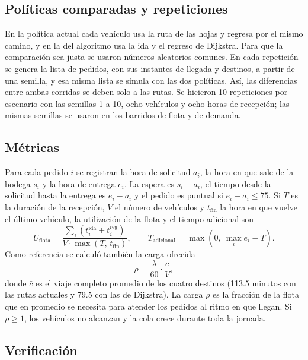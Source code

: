 \documentclass[11pt,letterpaper]{article}
\begin{document}
\subsection{Políticas comparadas y repeticiones}

En la política actual cada vehículo usa la ruta de las hojas y regresa por el mismo camino, y en la del algoritmo usa la ida y el regreso de Dijkstra. Para que la comparación sea justa se usaron números aleatorios comunes. En cada repetición se genera la lista de pedidos, con sus instantes de llegada y destinos, a partir de una semilla, y esa misma lista se simula con las dos políticas. Así, las diferencias entre ambas corridas se deben solo a las rutas. Se hicieron 10 repeticiones por escenario con las semillas 1 a 10, ocho vehículos y ocho horas de recepción; las mismas semillas se usaron en los barridos de flota y de demanda.

\subsection{Métricas}

Para cada pedido $i$ se registran la hora de solicitud $a_i$, la hora en que sale de la bodega $s_i$ y la hora de entrega $e_i$. La espera es $s_i-a_i$, el tiempo desde la solicitud hasta la entrega es $e_i-a_i$ y el pedido es puntual si $e_i-a_i\le 75$. Si $T$ es la duración de la recepción, $V$ el número de vehículos y $t_{\text{fin}}$ la hora en que vuelve el último vehículo, la utilización de la flota y el tiempo adicional son
\begin{equation}
  U_{\text{flota}} = \frac{\sum_i \left(t^{\text{ida}}_{i} + t^{\text{reg}}_{i}\right)}{V\cdot\max(T,\,t_{\text{fin}})},
  \qquad
  T_{\text{adicional}} = \max\left(0,\ \max_i e_i - T\right).
\end{equation}
Como referencia se calculó también la carga ofrecida
\begin{equation}
  \rho = \frac{\lambda}{60}\cdot\frac{\bar c}{V},
\end{equation}
donde $\bar c$ es el viaje completo promedio de los cuatro destinos (113.5 minutos con las rutas actuales y 79.5 con las de Dijkstra). La carga $\rho$ es la fracción de la flota que en promedio se necesita para atender los pedidos al ritmo en que llegan. Si $\rho\ge 1$, los vehículos no alcanzan y la cola crece durante toda la jornada.

\subsection{Verificación}
\end{document}
